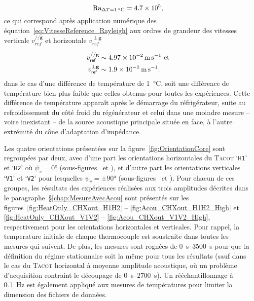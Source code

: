 \begin{equation}
	\Rayleigh_{\Delta T=\qty{1}{\degreeCelsius}}=\num{4.7e5},
	\label{eq:NbrRayleigh_Exple1K}
\end{equation}  
ce qui correspond après application numérique des équation~\eqref{eq:VitesseReference_Rayleigh} aux ordres de grandeur des vitesses verticale $v_{ref}^{// \mathbf g}$ et horizontale $v_{ref}^{\perp \mathbf g}$  

\begin{subequations}
	\begin{align}
		v_{\sf ref}^{// \mathbf g} &\sim \qty{4.97e-2}{\meter\per\second} \text{ et}	\label{eq:VitesseReferenceV_Rayleigh_Exple1K}\\
		v_{\sf ref}^{\perp \mathbf g} &\sim \qty{1.9e-3}{\meter\per\second}.	\label{eq:VitesseReferenceH_Rayleigh_Exple1K}
	\end{align}
	\label{eq:VitesseReference_Rayleigh_Exple5K}%
\end{subequations}
dans le cas d'une différence de température de \qty{1}{\degreeCelsius}, soit une différence de température bien plus faible que celles obtenus pour toutes les expériences. Cette différence de température apparaît après le démarrage du réfrigérateur, suite au refroidissement du côté froid du régénérateur et celui dans une moindre mesure -- voire inexistant -- de la source acoustique principale située en face, à l'autre extrémité du cône d'adaptation d'impédance.

Les quatre orientations présentées sur la figure~\ref{fig:OrientationCore} sont regroupées par deux, avec d'une part les orientations horizontales du \textsc{Tacot} `\texttt{H1}' et `\texttt{H2}' où $\psi_v=\ang{0}$ (sous-figures~ et ), et d'autre part les orientations verticales `\texttt{V1}' et `\texttt{V2}' pour lesquelles $\psi_v=\pm\ang{90}$ (sous-figures~ et ). Pour chacun de ces groupes, les résultats des expériences réalisées aux trois amplitudes décrites dans le paragraphe~§\ref{chap:MesureAvecAcou} sont présentés sur les figures~\ref{fig:HeatOnly_CHXout_H1H2} -- \ref{fig:Acou_CHXout_H1H2_High} et \ref{fig:HeatOnly_CHXout_V1V2} -- \ref{fig:Acou_CHXout_V1V2_High}, respectivement pour les orientations horizontales et verticales. Pour rappel, la temperature initiale de chaque thermocouple est soustraite dans toutes les mesures qui suivent. De plus, les mesures sont rognées de \qtyrange{0}{3500}{\second} pour que la définition du régime stationnaire soit la même pour tous les résultats (sauf dans le cas du \textsc{Tacot} horizontal à moyenne amplitude acoustique, où un problème d'acquisition contraint le découpage de \qtyrange{0}{2700}{\second}). Un rééchantillonnage à \qty{.1}{\hertz} est également appliqué aux mesures de températures pour limiter la dimension des fichiers de données.

